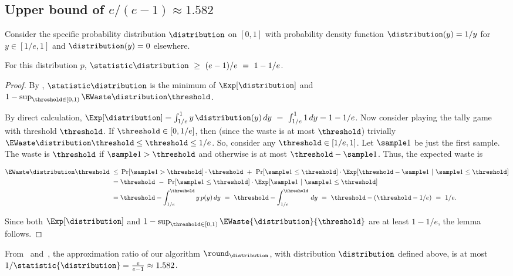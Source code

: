 \subsection{Upper bound of \texorpdfstring{$e/(e-1) \approx 1.582$}{e/(e-1) = 1.582}}

Consider the specific probability distribution $\distribution$ on $[0,1]$
with probability density function $\distribution(y) = 1/y$ for $y\in [1/e,1]$
and $\distribution(y) = 0$ elsewhere.

\begin{lemma}\label{lemma: upper bound 1}
  For this distribution $p$, $\statistic \distribution ~\ge~ (e-1)/e ~=~ 1-1/e$.
\end{lemma}

\begin{proof}
  By ,
  $\statistic \distribution$ is the minimum of $\Exp[\distribution]$ 
  and $1 - \sup_{\threshold \in [0,1)} \EWaste \distribution \threshold $.

  By direct calculation,
  $\Exp[\distribution] = \int_{1/e}^1 y\,\distribution(y)\, dy ~=~ \int_{1/e}^1 1\, dy = 1-1/e$.
  Now
  consider playing the tally game with threshold $\threshold$.
  If $\threshold \in[0, 1/e]$, then (since the waste is at most $\threshold$)
  trivially $\EWaste \distribution \threshold  \le \threshold \le 1/e$.
  So, consider any $\threshold\in [1/e,1]$.  Let $\sample 1$ be just the first sample.
  The waste is $\threshold$ if $\sample 1 > \threshold$ and otherwise is at most $\threshold-\sample 1$.
	Thus,  the expected waste is 

	\begin{align*}
		\EWaste \distribution \threshold \;
		\leq \; & \Pr[\sample 1 > \threshold] \cdot\threshold
		 		~+~ \Pr[\sample 1 \le \threshold]\cdot \Exp[\threshold - \sample 1 ~|~ \sample 1 \le \threshold]  \\
		= \; & \threshold ~-~ \Pr[\sample 1 \le \threshold]\cdot \Exp[\sample 1 ~|~ \sample 1 \le \threshold] \\
		= \; & \threshold - \int_{1/e}^\threshold y\, p(y)\, dy
	  ~=~
	  \threshold - \int_{1/e}^\threshold \, dy
	  ~=~ \threshold - (\threshold-1/e)
	  ~=~ 1/e.
	\end{align*}

Since  both $\Exp[\distribution]$ and
$1-\sup_{\threshold \in [0,1)}\EWaste{\distribution}{\threshold}$ are at least $1-1/e$, the lemma follows.
\end{proof}

From ~and~,
the approximation ratio of our
algorithm $\round_\distribution$, with distribution $\distribution$ defined above,
is at most $1/\statistic{\distribution} = \frac{e}{e-1} \approx 1.582$.



